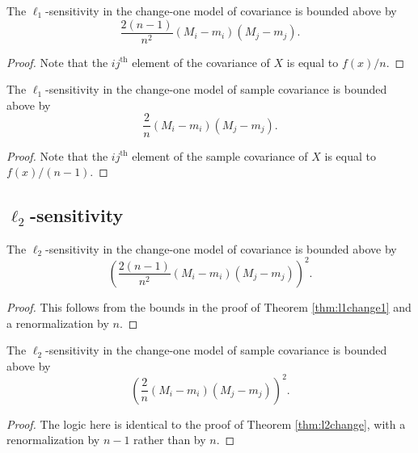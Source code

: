 \documentclass[11pt]{scrartcl} %
\begin{document}
\begin{corollary}
The $\ell_1$-sensitivity in the change-one model of covariance is bounded above by
$$\frac{2(n-1)}{n^2}  (M_i - m_i)(M_j - m_j).$$
\end{corollary}

\begin{proof}
Note that the $ij^{\text{th}}$ element of the covariance of $X$ is equal to $f(x)/n$.
\end{proof}

\begin{corollary}
\label{cor:renorm2}
The $\ell_1$-sensitivity in the change-one model of sample covariance is bounded above by
$$\frac{2}{n}  (M_i - m_i)(M_j - m_j).$$
\end{corollary}

\begin{proof}
Note that the $ij^{\text{th}}$ element of the sample covariance of $X$ is equal to $f(x)/(n-1)$.
\end{proof}

\subsection{$\ell_2$-sensitivity}

\begin{theorem}
\label{thm:l2change}
The $\ell_2$-sensitivity in the change-one model of covariance is bounded above by 
$$\left(\frac{2(n-1)}{n^2}  (M_i - m_i)(M_j - m_j)\right)^2.$$
\end{theorem}

\begin{proof}
This follows from the bounds in the proof of Theorem \ref{thm:l1change1} and a renormalization by $n$.
\end{proof}

\begin{corollary}
The $\ell_2$-sensitivity in the change-one model of sample covariance is bounded above by 
$$\left(\frac{2}{n}  (M_i - m_i)(M_j - m_j)\right)^2.$$
\end{corollary}

\begin{proof}
The logic here is identical to the proof of Theorem \ref{thm:l2change}, with a renormalization by $n-1$ rather than by $n$.
\end{proof}



\end{document}
